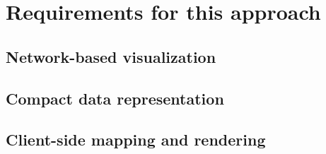 
\cleardoublepage              %
\chapter{Requirements for this approach}
  \label{chap:requr}




  \section{Network-based visualization}
    \label{sec:requr:netwr}
  \section{Compact data representation}
    \label{sec:requr:data}
  \section{Client-side mapping and rendering}
    \label{sec:requr:clien}
